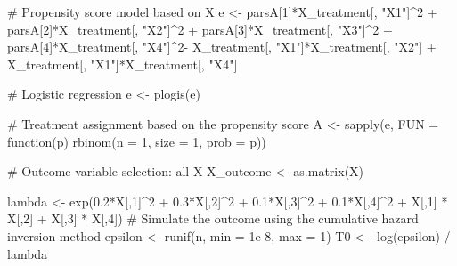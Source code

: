 \documentclass[
  11pt,
  a4paper,
]{article}
\newenvironment{Shaded}{}{}
\newcommand{\AttributeTok}[1]{\textcolor[rgb]{0.84,0.23,0.29}{#1}}
\newcommand{\CommentTok}[1]{\textcolor[rgb]{0.42,0.45,0.49}{#1}}
\newcommand{\ControlFlowTok}[1]{\textcolor[rgb]{0.84,0.23,0.29}{#1}}
\newcommand{\DecValTok}[1]{\textcolor[rgb]{0.00,0.36,0.77}{#1}}
\newcommand{\FloatTok}[1]{\textcolor[rgb]{0.00,0.36,0.77}{#1}}
\newcommand{\FunctionTok}[1]{\textcolor[rgb]{0.44,0.26,0.76}{#1}}
\newcommand{\NormalTok}[1]{\textcolor[rgb]{0.14,0.16,0.18}{#1}}
\newcommand{\OtherTok}[1]{\textcolor[rgb]{0.44,0.26,0.76}{#1}}
\newcommand{\SpecialCharTok}[1]{\textcolor[rgb]{0.00,0.36,0.77}{#1}}
\newcommand{\StringTok}[1]{\textcolor[rgb]{0.01,0.18,0.38}{#1}}
\theoremstyle{plain}
\theoremstyle{plain}
\theoremstyle{plain}
\theoremstyle{definition}
\theoremstyle{remark}
\begin{document}
\begin{Shaded}
\begin{Highlighting}[]
  \CommentTok{\# Propensity score model based on X}
\NormalTok{  e }\OtherTok{\textless{}{-}}\NormalTok{ parsA[}\DecValTok{1}\NormalTok{]}\SpecialCharTok{*}\NormalTok{X\_treatment[, }\StringTok{"X1"}\NormalTok{]}\SpecialCharTok{\^{}}\DecValTok{2} \SpecialCharTok{+}\NormalTok{ parsA[}\DecValTok{2}\NormalTok{]}\SpecialCharTok{*}\NormalTok{X\_treatment[, }\StringTok{"X2"}\NormalTok{]}\SpecialCharTok{\^{}}\DecValTok{2} \SpecialCharTok{+} 
\NormalTok{    parsA[}\DecValTok{3}\NormalTok{]}\SpecialCharTok{*}\NormalTok{X\_treatment[, }\StringTok{"X3"}\NormalTok{]}\SpecialCharTok{\^{}}\DecValTok{2} \SpecialCharTok{+}\NormalTok{ parsA[}\DecValTok{4}\NormalTok{]}\SpecialCharTok{*}\NormalTok{X\_treatment[, }\StringTok{"X4"}\NormalTok{]}\SpecialCharTok{\^{}}\DecValTok{2}\SpecialCharTok{{-}}
\NormalTok{    X\_treatment[, }\StringTok{"X1"}\NormalTok{]}\SpecialCharTok{*}\NormalTok{X\_treatment[, }\StringTok{"X2"}\NormalTok{] }\SpecialCharTok{+}
\NormalTok{    X\_treatment[, }\StringTok{"X1"}\NormalTok{]}\SpecialCharTok{*}\NormalTok{X\_treatment[, }\StringTok{"X4"}\NormalTok{]}
  
  \CommentTok{\# Logistic regression}
\NormalTok{  e }\OtherTok{\textless{}{-}} \FunctionTok{plogis}\NormalTok{(e)}
  
  \CommentTok{\# Treatment assignment based on the propensity score}
\NormalTok{  A }\OtherTok{\textless{}{-}} \FunctionTok{sapply}\NormalTok{(e, }\AttributeTok{FUN =} \ControlFlowTok{function}\NormalTok{(p) }\FunctionTok{rbinom}\NormalTok{(}\AttributeTok{n =} \DecValTok{1}\NormalTok{, }\AttributeTok{size =} \DecValTok{1}\NormalTok{, }\AttributeTok{prob =}\NormalTok{ p))}
  
  \CommentTok{\# Outcome variable selection: all X}
\NormalTok{  X\_outcome }\OtherTok{\textless{}{-}} \FunctionTok{as.matrix}\NormalTok{(X)}
  
\NormalTok{  lambda }\OtherTok{\textless{}{-}} \FunctionTok{exp}\NormalTok{(}\FloatTok{0.2}\SpecialCharTok{*}\NormalTok{X[,}\DecValTok{1}\NormalTok{]}\SpecialCharTok{\^{}}\DecValTok{2} \SpecialCharTok{+} \FloatTok{0.3}\SpecialCharTok{*}\NormalTok{X[,}\DecValTok{2}\NormalTok{]}\SpecialCharTok{\^{}}\DecValTok{2} \SpecialCharTok{+} \FloatTok{0.1}\SpecialCharTok{*}\NormalTok{X[,}\DecValTok{3}\NormalTok{]}\SpecialCharTok{\^{}}\DecValTok{2} \SpecialCharTok{+} \FloatTok{0.1}\SpecialCharTok{*}\NormalTok{X[,}\DecValTok{4}\NormalTok{]}\SpecialCharTok{\^{}}\DecValTok{2} \SpecialCharTok{+} 
\NormalTok{    X[,}\DecValTok{1}\NormalTok{] }\SpecialCharTok{*}\NormalTok{ X[,}\DecValTok{2}\NormalTok{] }\SpecialCharTok{+}\NormalTok{ X[,}\DecValTok{3}\NormalTok{] }\SpecialCharTok{*}\NormalTok{ X[,}\DecValTok{4}\NormalTok{])}
  \CommentTok{\# Simulate the outcome using the cumulative hazard inversion method}
\NormalTok{  epsilon }\OtherTok{\textless{}{-}} \FunctionTok{runif}\NormalTok{(n, }\AttributeTok{min =} \FloatTok{1e{-}8}\NormalTok{, }\AttributeTok{max =} \DecValTok{1}\NormalTok{)}
\NormalTok{  T0 }\OtherTok{\textless{}{-}} \SpecialCharTok{{-}}\FunctionTok{log}\NormalTok{(epsilon) }\SpecialCharTok{/}\NormalTok{ lambda}
  

\end{Highlighting}
\end{Shaded}
\end{document}

